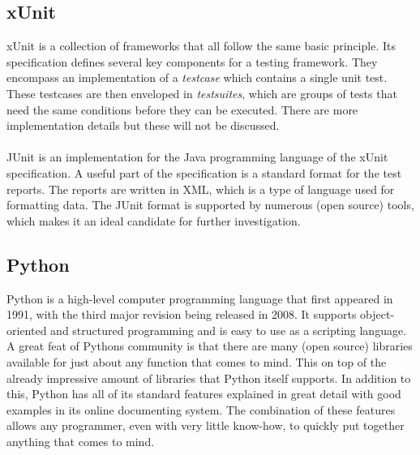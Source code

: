 \documentclass[11pt,british]{article}
\begin{document}
\subsection{xUnit}
\label{subsec:xUnit}
xUnit is a collection of frameworks that all follow the same basic principle. Its specification defines several key components for a testing framework. They encompass an implementation of a \emph{testcase} which contains a single unit test. These testcases are then enveloped in \emph{testsuites}, which are groups of tests that need the same conditions before they can be executed.  There are more implementation details but these will not be discussed.\cite{xunit2}
\\
\\
JUnit is an implementation for the Java programming language of the xUnit specification. A useful part of the specification is a standard format for the test reports. The reports are written in \gls{XML}, which is a type of language used for formatting data. The JUnit format is supported by numerous (open source) tools, which makes it an ideal candidate for further investigation.\cite{xunit,junitxml,junit}

\subsection{Python}
Python is a high-level computer programming language that first appeared in 1991, with the third major revision being released in 2008. It supports object-oriented and structured programming and is easy to use as a scripting language. A great feat of Pythons community is that there are many (open source) libraries available for just about any function that comes to mind. This on top of the already impressive amount of libraries that Python itself supports. In addition to this, Python has all of its standard features explained in great detail with good examples in its online documenting system. The combination of these features allows any programmer, even with very little know-how, to quickly put together anything that comes to mind.\cite{python1}

\end{document}
